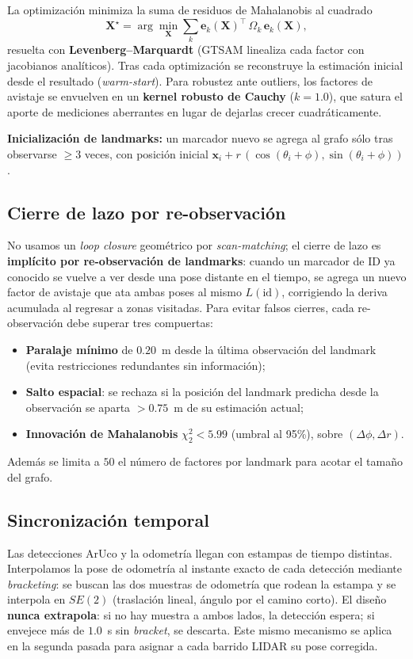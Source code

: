 La optimización minimiza la suma de residuos de Mahalanobis al cuadrado
\begin{equation}
\mathbf{X}^\star=\arg\min_{\mathbf{X}}\sum_{k}\mathbf{e}_k(\mathbf{X})^\top\,\Omega_k\,\mathbf{e}_k(\mathbf{X}),
\end{equation}
resuelta con \textbf{Levenberg--Marquardt} (GTSAM linealiza cada factor con jacobianos analíticos). Tras cada optimización se reconstruye la estimación inicial desde el resultado (\emph{warm-start}). Para robustez ante outliers, los factores de avistaje se envuelven en un \textbf{kernel robusto de Cauchy} ($k=1.0$), que satura el aporte de mediciones aberrantes en lugar de dejarlas crecer cuadráticamente.

\textbf{Inicialización de landmarks:} un marcador nuevo se agrega al grafo sólo tras observarse $\geq 3$ veces, con posición inicial $\mathbf{x}_i + r\,(\cos(\theta_i+\phi),\sin(\theta_i+\phi))$.

\subsection{Cierre de lazo por re-observación}
No usamos un \emph{loop closure} geométrico por \emph{scan-matching}; el cierre de lazo es \textbf{implícito por re-observación de landmarks}: cuando un marcador de ID ya conocido se vuelve a ver desde una pose distante en el tiempo, se agrega un nuevo factor de avistaje que ata ambas poses al mismo $L(\text{id})$, corrigiendo la deriva acumulada al regresar a zonas visitadas. Para evitar falsos cierres, cada re-observación debe superar tres compuertas:
\begin{itemize}
\item \textbf{Paralaje mínimo} de $0.20$~m desde la última observación del landmark (evita restricciones redundantes sin información);
\item \textbf{Salto espacial}: se rechaza si la posición del landmark predicha desde la observación se aparta $> 0.75$~m de su estimación actual;
\item \textbf{Innovación de Mahalanobis} $\chi^2_{2} < 5.99$ (umbral al 95\%), sobre $(\Delta\phi,\Delta r)$.
\end{itemize}
Además se limita a $50$ el número de factores por landmark para acotar el tamaño del grafo.

\subsection{Sincronización temporal}
Las detecciones ArUco y la odometría llegan con estampas de tiempo distintas. Interpolamos la pose de odometría al instante exacto de cada detección mediante \emph{bracketing}: se buscan las dos muestras de odometría que rodean la estampa y se interpola en $SE(2)$ (traslación lineal, ángulo por el camino corto). El diseño \textbf{nunca extrapola}: si no hay muestra a ambos lados, la detección espera; si envejece más de $1.0$~s sin \emph{bracket}, se descarta. Este mismo mecanismo se aplica en la segunda pasada para asignar a cada barrido LIDAR su pose corregida.

